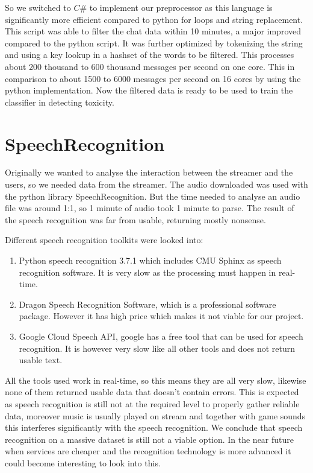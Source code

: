 \documentclass[final]{report}
\begin{document}
So we switched to $C\#$ to implement our preprocessor as this language is significantly more efficient compared to python for loops and string replacement.
This script was able to filter the chat data within 10 minutes, a major improved compared to the python script.
It was further optimized by tokenizing the string and using a key lookup in a hashset of the words to be filtered.
This processes about 200 thousand to 600 thousand messages per second on one core.
This in comparison to about 1500 to 6000 messages per second on 16 cores by using the python implementation.
Now the filtered data is ready to be used to train the classifier in detecting toxicity.

\section{SpeechRecognition}
Originally we wanted to analyse the interaction between the streamer and the users, so we needed data from the streamer.
The audio downloaded was used with the python library SpeechRecognition. %
But the time needed to analyse an audio file was around 1:1, so 1 minute of audio took 1 minute to parse. The result of the speech recognition was far from usable, returning mostly nonsense.

Different speech recognition toolkits were looked into:
\begin{enumerate}
\item Python speech recognition 3.7.1 which includes CMU Sphinx as speech recognition software. It is very slow as the processing must happen in real-time.
\item Dragon Speech Recognition Software, which is a professional software package. However it has high price which makes it not viable for our project.
\item Google Cloud Speech API, google has a free tool that can be used for speech recognition. It is however very slow like all other tools and does not return usable text.
\end{enumerate}

All the tools used work in real-time, so this means they are all very slow, likewise none of them returned usable data that doesn't contain errors.
This is expected as speech recognition is still not at the required level to properly gather reliable data, moreover music is usually played on stream and together with game sounds this interferes significantly with the speech recognition.
We conclude that speech recognition on a massive dataset is still not a viable option.
In the near future when services are cheaper and the recognition technology is more advanced it could become interesting to look into this.
\end{document}
